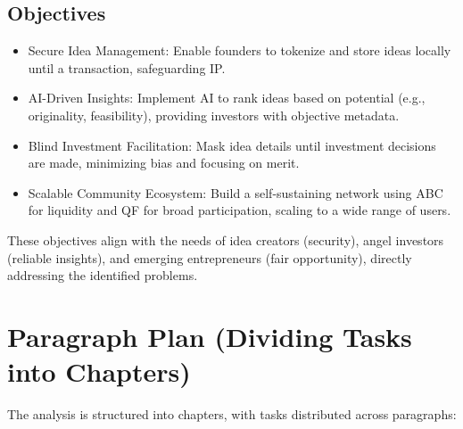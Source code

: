 \documentclass[12pt]{article}
\begin{document}
\subsection{Objectives}
\begin{itemize}
    \item Secure Idea Management: Enable founders to tokenize and store ideas locally until a transaction, safeguarding IP.
    \item AI-Driven Insights: Implement AI to rank ideas based on potential (e.g., originality, feasibility), providing investors with objective metadata.
    \item Blind Investment Facilitation: Mask idea details until investment decisions are made, minimizing bias and focusing on merit.
    \item Scalable Community Ecosystem: Build a self-sustaining network using ABC for liquidity and QF for broad participation, scaling to a wide range of users.
\end{itemize}

These objectives align with the needs of idea creators (security), angel investors (reliable insights), and emerging entrepreneurs (fair opportunity), directly addressing the identified problems.

\section{Paragraph Plan (Dividing Tasks into Chapters)}

The analysis is structured into chapters, with tasks distributed across paragraphs:
\end{document}
